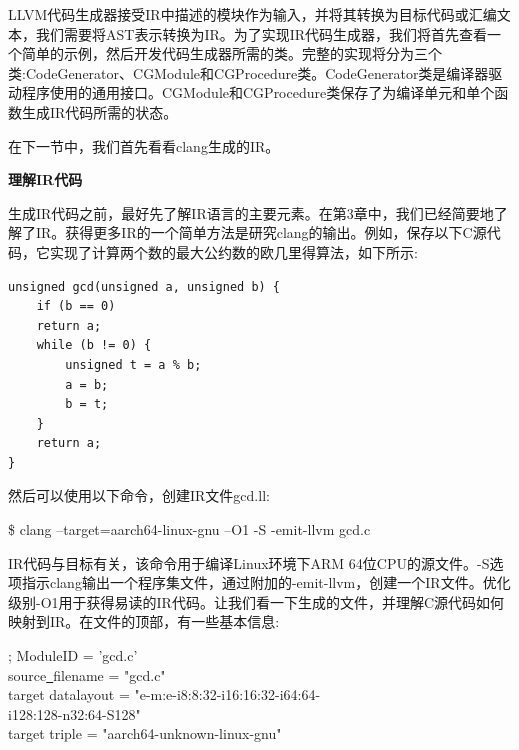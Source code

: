 LLVM代码生成器接受IR中描述的模块作为输入，并将其转换为目标代码或汇编文本，我们需要将AST表示转换为IR。为了实现IR代码生成器，我们将首先查看一个简单的示例，然后开发代码生成器所需的类。完整的实现将分为三个类:CodeGenerator、CGModule和CGProcedure类。CodeGenerator类是编译器驱动程序使用的通用接口。CGModule和CGProcedure类保存了为编译单元和单个函数生成IR代码所需的状态。\par

在下一节中，我们首先看看clang生成的IR。\par


\hspace*{\fill} \par %
\textbf{理解IR代码}

生成IR代码之前，最好先了解IR语言的主要元素。在第3章中，我们已经简要地了解了IR。获得更多IR的一个简单方法是研究clang的输出。例如，保存以下C源代码，它实现了计算两个数的最大公约数的欧几里得算法，如下所示:\par

\begin{lstlisting}[caption={}]
unsigned gcd(unsigned a, unsigned b) {
	if (b == 0)
	return a;
	while (b != 0) {
		unsigned t = a % b;
		a = b;
		b = t;
	}
	return a;
}
\end{lstlisting}

然后可以使用以下命令，创建IR文件gcd.ll:\par

\begin{tcolorbox}[colback=white,colframe=black]
\$ clang --target=aarch64-linux-gnu –O1 -S -emit-llvm gcd.c
\end{tcolorbox}

IR代码与目标有关，该命令用于编译Linux环境下ARM 64位CPU的源文件。-S选项指示clang输出一个程序集文件，通过附加的-emit-llvm，创建一个IR文件。优化级别-O1用于获得易读的IR代码。让我们看一下生成的文件，并理解C源代码如何映射到IR。在文件的顶部，有一些基本信息:\par

\begin{tcolorbox}[colback=white,colframe=black]
; ModuleID = 'gcd.c' \\
source\underline{~}filename = "gcd.c" \\
target datalayout = "e-m:e-i8:8:32-i16:16:32-i64:64- \\
\hspace*{3.5cm}i128:128-n32:64-S128" \\
target triple = "aarch64-unknown-linux-gnu"
\end{tcolorbox}

